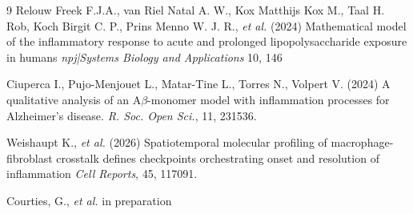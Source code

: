 \documentclass[a4paper, 12pt]{article}
\providecommand{\DIFaddtex}[1]{{\protect\color{blue} \sf #1}} %
\providecommand{\DIFdeltex}[1]{{\protect\color{red} \scriptsize #1}} %
\providecommand{\DIFaddbegin}{} %
\providecommand{\DIFaddend}{} %
\providecommand{\DIFdelbegin}{} %
\providecommand{\DIFdelend}{} %
\providecommand{\DIFadd}[1]{\texorpdfstring{\DIFaddtex{#1}}{#1}} %
\providecommand{\DIFdel}[1]{\texorpdfstring{\DIFdeltex{#1}}{}} %
\begin{document}
\begin{thebibliography}{9}
 Relouw \DIFdelbegin \DIFdel{Freek }\DIFdelend \DIFaddbegin \DIFadd{F.}\DIFaddend J.A.,    \DIFdelbegin \DIFdel{van Riel Natal A. W.,  Kox Matthijs}\DIFdelend \DIFaddbegin \DIFadd{Kox M.}\DIFaddend ,  Taal H.\DIFdelbegin \DIFdel{Rob,  Koch Birgit C. P.,  Prins Menno W. J.
}\DIFdelend \DIFaddbegin \DIFadd{R.,  \textit{et al.}
}\DIFaddend (2024)
\DIFdelbegin %
\DIFdel{Mathematical model of the inﬂammatory
response to acute and prolonged
lipopolysaccharide exposure in humans
}%
\DIFdel{\emph{npj|Systems Biology and Applications} 10, 146
}%
\DIFdelend \DIFaddbegin {}
\DIFaddend 

Ciuperca I., Pujo-Menjouet L., 
Matar-Tine L., Torres N., Volpert V. (2024)
\DIFdelbegin %
\DIFdel{A qualitative analysis of an A$\beta$-monomer model with inflammation processes for Alzheimer’s
disease.
}%
\DIFdel{\emph{R. Soc. Open Sci.}, 11, 231536.
}%
\DIFdelend \DIFaddbegin {}
\DIFaddend %

Weishaupt K., \textit{et al.}  (2026)
\DIFdelbegin %
\DIFdel{Spatiotemporal molecular profiling of macrophage-fibroblast crosstalk defines checkpoints orchestrating onset and resolution of inflammation
}%
\DIFdel{\emph{Cell Reports},  45, 117091.
}%
\DIFdelend \DIFaddbegin {}

 \DIFaddend 

\DIFdelbegin {}\DIFdel{Courties, G., \textit{et al.} 
}%
\DIFdel{in preparation
}\DIFdelend \end{thebibliography}
\end{document}
